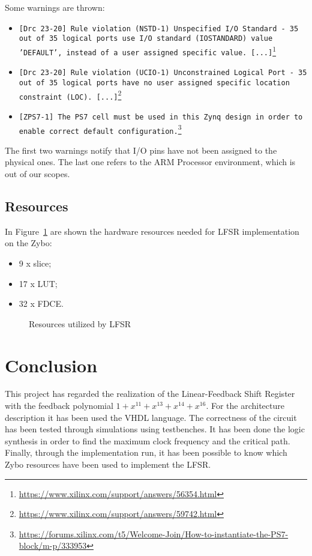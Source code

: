 \documentclass[11pt,a4paper,oneside, openright]{article}
\begin{document}
Some warnings are thrown:
\begin{itemize}
    \item \texttt{[Drc 23-20] Rule violation (NSTD-1) Unspecified I/O Standard - 35 out of 35 logical ports use I/O standard (IOSTANDARD) value 'DEFAULT', instead of a user assigned specific value. [...]}\footnote{\url{https://www.xilinx.com/support/answers/56354.html}}
    \item \texttt{[Drc 23-20] Rule violation (UCIO-1) Unconstrained Logical Port - 35 out of 35 logical ports have no user assigned specific location constraint (LOC). [...]}\footnote{\url{https://www.xilinx.com/support/answers/59742.html}}
    \item \texttt{[ZPS7-1] The PS7 cell must be used in this Zynq design in order to enable correct default configuration.}\footnote{\url{https://forums.xilinx.com/t5/Welcome-Join/How-to-instantiate-the-PS7-block/m-p/333953}}
\end{itemize}

The first two warnings notify that I/O pins have not been assigned to the physical ones. The last one refers to the ARM Processor environment, which is out of our scopes.

\subsection{Resources}
In Figure~\ref{fig:resources} are shown the hardware resources needed for LFSR implementation on the Zybo:

\begin{itemize}
    \item 9 x slice;
    \item 17 x LUT;
    \item 32 x FDCE.
\end{itemize}

\begin{figure}[h]
    \centering
    \hfill
    \caption{Resources utilized by LFSR}
    \label{fig:resources}
\end{figure}

\section{Conclusion}
This project has regarded the realization of the Linear-Feedback Shift Register with the feedback polynomial $ 1 + x^{11} + x^{13} + x^{14} + x^{16} $. For the architecture description it has been used the VHDL language. The correctness of the circuit has been tested through simulations using testbenches. It has been done the logic synthesis in order to find the maximum clock frequency and the critical path. Finally, through the implementation run, it has been possible to know which Zybo resources have been used to implement the LFSR.

\newpage

\begin{appendix}
    \listoffigures
    \lstlistoflistings
\end{appendix}

 

\end{document}
